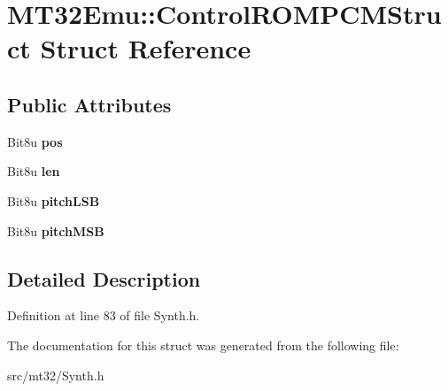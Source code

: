 \hypertarget{structMT32Emu_1_1ControlROMPCMStruct}{\section{M\-T32\-Emu\-:\-:Control\-R\-O\-M\-P\-C\-M\-Struct Struct Reference}
\label{structMT32Emu_1_1ControlROMPCMStruct}
}
\subsection*{Public Attributes}
\begin{DoxyCompactItemize}
\item 
\hypertarget{structMT32Emu_1_1ControlROMPCMStruct_acd7477fd6539e3a286f352b2e7a68e21}{Bit8u {\bfseries pos}}\label{structMT32Emu_1_1ControlROMPCMStruct_acd7477fd6539e3a286f352b2e7a68e21}

\item 
\hypertarget{structMT32Emu_1_1ControlROMPCMStruct_abff0ab71d17237aca7e419b71f02a7cf}{Bit8u {\bfseries len}}\label{structMT32Emu_1_1ControlROMPCMStruct_abff0ab71d17237aca7e419b71f02a7cf}

\item 
\hypertarget{structMT32Emu_1_1ControlROMPCMStruct_ace91211734ca86ce18c930b366143447}{Bit8u {\bfseries pitch\-L\-S\-B}}\label{structMT32Emu_1_1ControlROMPCMStruct_ace91211734ca86ce18c930b366143447}

\item 
\hypertarget{structMT32Emu_1_1ControlROMPCMStruct_ae1820c8af97b1636e53e9062949d2ac8}{Bit8u {\bfseries pitch\-M\-S\-B}}\label{structMT32Emu_1_1ControlROMPCMStruct_ae1820c8af97b1636e53e9062949d2ac8}

\end{DoxyCompactItemize}


\subsection{Detailed Description}


Definition at line 83 of file Synth.\-h.



The documentation for this struct was generated from the following file\-:\begin{DoxyCompactItemize}
\item 
src/mt32/Synth.\-h\end{DoxyCompactItemize}
